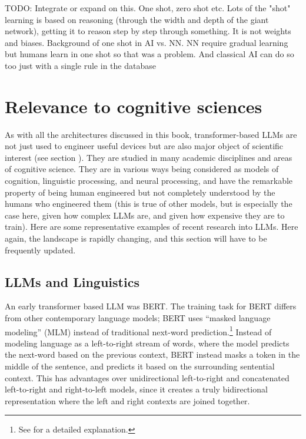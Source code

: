 TODO: Integrate or expand on this. One shot, zero shot etc. Lots of the "shot" learning is based on reasoning  (through the width and depth of the giant network), getting it to reason step by step through something. It is not weights and biases.  Background of one shot in AI vs. NN. NN require gradual learning but humans learn in one shot so that was a problem. And classical AI can do so too just with a single rule in the database


\section{Relevance to cognitive sciences}\label{sect_bert}

As with all the architectures discussed in this book, transformer-based LLMs are not just used to engineer useful devices but are also major object of scientific interest (see section ). They are studied in many academic disciplines and areas of cognitive science. They are in various ways being considered as models of cognition, linguistic processing, and neural processing, and have the remarkable property of being human engineered but not completely understood by the humans who engineered them (this is true of other models, but is especially the case here, given how complex LLMs are, and given how expensive they are to train). Here are some representative examples of recent research into LLMs.  Here again, the landscape is rapidly changing, and this section will have to be frequently updated.

\subsection{LLMs and Linguistics}

An early transformer based LLM was BERT. The training task for BERT differs from other contemporary language models; BERT uses ``masked language modeling'' (MLM) instead of traditional next-word prediction.\footnote{See \cite{devlin2018bert} for a detailed explanation.} Instead of modeling language as a left-to-right stream of words, where the model predicts the next-word based on the previous context, BERT instead masks a token in the middle of the sentence, and predicts it based on the surrounding sentential context. This has advantages over unidirectional left-to-right and concatenated left-to-right and right-to-left models, since it creates a truly bidirectional representation where the left and right contexts are joined together.

